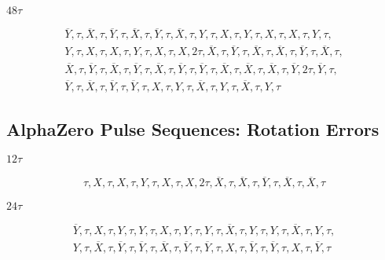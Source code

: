\noindent $48\tau$

\begin{equation*}
\begin{aligned}
    \overline{Y}, \tau, \overline{X}, \tau, \overline{Y}, \tau, \overline{X}, \tau, \overline{Y}, \tau, \overline{X}, \tau, Y, \tau, X, \tau, Y, \tau, X, \tau, X, \tau, Y, \tau, \\
    Y, \tau, X, \tau, X, \tau, Y, \tau, X, \tau, X, 2\tau, \overline{X}, \tau, \overline{Y}, \tau, \overline{X}, \tau, \overline{X}, \tau, \overline{Y}, \tau, \overline{X}, \tau, \\
    \overline{X}, \tau, \overline{Y}, \tau, \overline{X}, \tau, \overline{Y}, \tau, \overline{X}, \tau, \overline{Y}, \tau, \overline{Y}, \tau,
    \overline{X}, \tau, \overline{X}, \tau, \overline{X}, \tau, \overline{Y}, 2\tau, \overline{Y}, \tau, \\
    \overline{Y}, \tau, \overline{X}, \tau, \overline{Y}, \tau, \overline{Y}, \tau, X, \tau, Y, \tau, \overline{X}, \tau, Y, \tau, \overline{X}, \tau, Y, \tau
\end{aligned}
\end{equation*}


\subsection{AlphaZero Pulse Sequences: Rotation Errors}

\noindent $12\tau$

\begin{equation*}
\begin{aligned}
    \tau, X, \tau, X, \tau, Y, \tau, X, \tau, X, 2\tau, \overline{X}, \tau, \overline{X}, \tau, \overline{Y}, \tau, \overline{X}, \tau, \overline{X}, \tau
\end{aligned}
\end{equation*}

\noindent $24\tau$

\begin{equation*}
\begin{aligned}
    \overline{Y}, \tau, X, \tau, Y, \tau, Y, \tau, X, \tau, Y, \tau, Y, \tau, \overline{X}, \tau, Y, \tau, Y, \tau, \overline{X}, \tau, Y, \tau, \\
    Y, \tau, \overline{X}, \tau, \overline{Y}, \tau, \overline{Y}, \tau, \overline{X}, \tau, \overline{Y}, \tau, \overline{Y}, \tau, X, \tau, \overline{Y}, \tau, \overline{Y}, \tau, X, \tau, \overline{Y}, \tau
\end{aligned}
\end{equation*}

